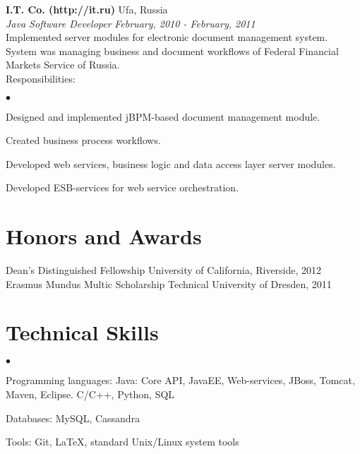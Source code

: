 \documentclass[margin,line]{res}
\newenvironment{list2}{
  \begin{list}{$\bullet$}{%
      \setlength{\itemsep}{0in}
      \setlength{\parsep}{0in} \setlength{\parskip}{0in}
      \setlength{\topsep}{0in} \setlength{\partopsep}{0in} 
      \setlength{\leftmargin}{0.2in}}}{\end{list}}
\begin{document}
\begin{resume}
{\bf I.T. Co. (http://it.ru)} \hfill { Ufa, Russia }\\
{\em Java Software Developer} \hfill {\it February, 2010 - February, 2011}\\
Implemented server modules for electronic document management system. System was managing business and document workflows of Federal Financial Markets Service of Russia.\\
Responsibilities:
\begin{list2}
	\item Designed and implemented jBPM-based document management module.
	\item Created business process workflows.
	\item Developed web services, business logic and data access layer server modules.
	\item Developed ESB-services for web service orchestration.
\end{list2}

\section{\sc Honors and Awards} 
Dean's Distinguished Fellowship \hfill University of California, Riverside, 2012 \\
Erasmus Mundus Multic Scholarship \hfill Technical University of Dresden, 2011 \\

\section{\sc Technical Skills} 
\begin{list2}
\item Programming languages:
\subitem{$\bullet$} Java:  Core API, JavaEE, Web-services, JBoss, Tomcat, Maven, Eclipse.
\subitem{$\bullet$} C/C++, Python, SQL%
\item Databases: MySQL, Cassandra
\item Tools: Git, \LaTeX, standard Unix/Linux system tools\\ 
\end{list2}


\end{resume}
\end{document}
